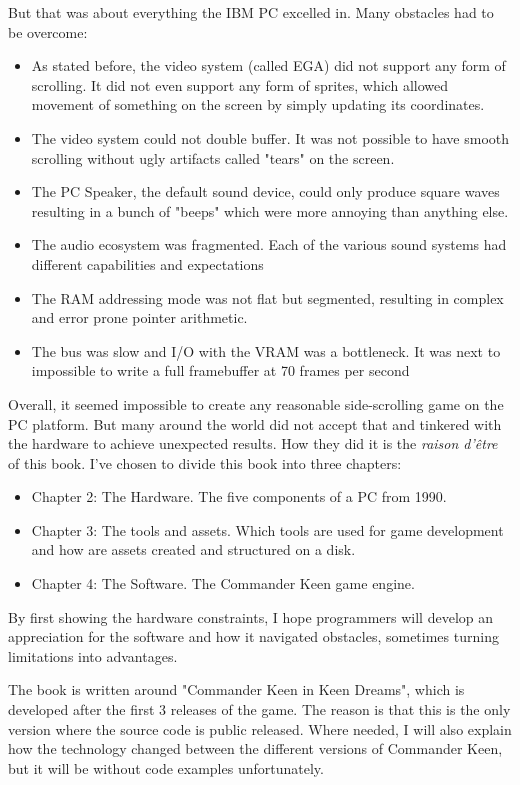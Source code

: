 \documentclass[book.tex]{subfiles}
\begin{document}
But that was about everything the IBM PC excelled in. Many obstacles had to be overcome:
\begin{itemize}
  \item As stated before, the video system (called EGA) did not support any form of scrolling. It did not even support any form of sprites, which allowed movement of something on the screen by simply updating its  coordinates.
  \item The video system could not double buffer. It was not possible to have smooth scrolling without ugly artifacts called "tears" on the screen.
  \item The PC Speaker, the default sound device, could only produce square waves resulting in a bunch of "beeps" which were more annoying than anything else.
  \item The audio ecosystem was fragmented. Each of the various sound systems had
different capabilities and expectations
  \item The RAM addressing mode was not flat but segmented, resulting in complex and
error prone pointer arithmetic.
  \item The bus was slow and I/O with the VRAM was a bottleneck. It was next to impossible to write a full framebuffer at 70 frames per second
\end{itemize}
\par
Overall, it seemed impossible to create any reasonable side-scrolling game on the PC platform. But many around the world did not accept that and tinkered with the hardware to achieve unexpected results. How they did it is the \textit{raison d'\^etre} of this book. I've chosen to divide this book into three chapters:
\begin{itemize}
  \item Chapter 2: The Hardware. The five components of a PC from 1990.
  \item Chapter 3: The tools and assets. Which tools are used for game development and how are assets created and structured on a disk.
  \item Chapter 4: The Software. The Commander Keen game engine.
\end{itemize}
By first showing the hardware constraints, I hope programmers will develop an appreciation for the software and how it navigated obstacles, sometimes turning limitations into advantages.\\
\par
The book is written around "Commander Keen in Keen Dreams", which is developed after the first 3 releases of the game. The reason is that this is the only version where the source code is public released. Where needed, I will also explain how the technology changed between the different versions of Commander Keen, but it will be without code examples unfortunately.\\
\end{document}
